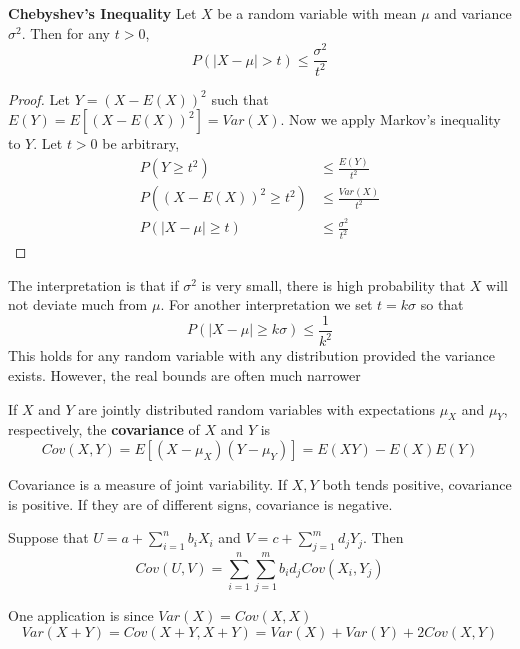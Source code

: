 \documentclass[11pt]{article}
\begin{document}
\begin{theorem*}
  \textbf{Chebyshev's Inequality} Let $X$ be a random variable with mean $\mu$ and variance $\sigma^2$. Then for any $t>0$,
  \[
    P(|X-\mu| > t) \leq \frac{\sigma^2}{t^2}
  \]
  \begin{proof}
    Let $Y =(X-E(X))^2$ such that $E(Y) = E[(X-E(X))^2] = Var(X)$. Now we apply Markov's inequality to $Y$. Let $t>0$ be arbitrary,
    \begin{align*}
      P(Y \geq t^2) &\leq \frac{E(Y)}{t^2} \\
      P((X-E(X))^2 \geq t^2) &\leq \frac{Var(X)}{t^2}\\
      P(|X-\mu| \geq t) &\leq  \frac{\sigma^2}{t^2}
    \end{align*}
  \end{proof}
  \begin{rem}
    The interpretation is that if $\sigma^2$ is very small, there is high probability that $X$ will not deviate much from $\mu$. For another interpretation we set $t = k\sigma$ so that
    \[
      P(|X-\mu| \geq k\sigma) \leq \frac{1}{k^2}
    \]
    This holds for any random variable with any distribution provided the variance exists. However, the real bounds are often much narrower
  \end{rem}
\end{theorem*}



\begin{defn*}
  If $X$ and $Y$ are jointly distributed random variables with expectations $\mu_X$ and $\mu_Y$, respectively, the \textbf{covariance} of $X$ and $Y$ is
  \[
    Cov(X,Y) = E[(X-\mu_X)(Y-\mu_Y)] = E(XY) - E(X)E(Y)
  \]
  \begin{rem}
    Covariance is a measure of joint variability. If $X,Y$ both tends positive, covariance is positive. If they are of different signs, covariance is negative.
  \end{rem}
\end{defn*}

\begin{theorem*}
  Suppose that $U = a + \sum_{i=1}^{n} b_i X_i$ and $V = c+ \sum_{j=1}^{m} d_j Y_j$. Then
  \[
    Cov(U, V) = \sum_{i=1}^{n} \sum_{j=1}^{m} b_i d_j Cov(X_i, Y_j)
  \]
  \begin{rem}
    One application is since $Var(X) = Cov(X,X)$
    \[
      Var(X+Y) = Cov(X+Y, X+Y) = Var(X) + Var(Y) + 2Cov(X,Y)
    \]
  \end{rem}
\end{theorem*}
\end{document}
